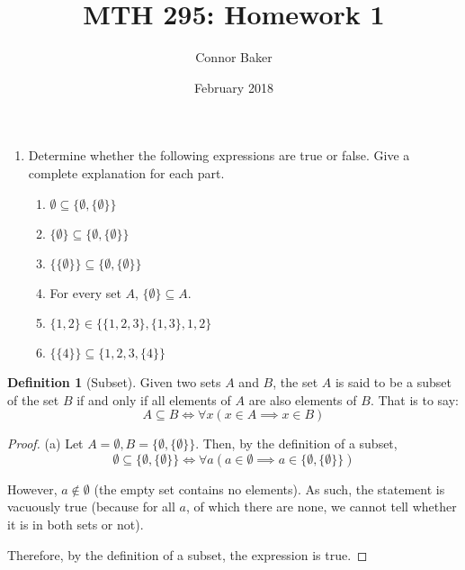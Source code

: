 \documentclass[10pt]{article}
\title{MTH 295: Homework 1}
\author{Connor Baker}
\date{February 2018}
\theoremstyle{definition}
\theoremstyle{definition}
\newtheorem*{definition}{Definition}
\theoremstyle{plain}
\begin{document}
\maketitle

\begin{enumerate}
\item Determine whether the following expressions are true or false. Give a complete explanation for each part.
\begin{enumerate}
\item $\emptyset \subseteq \{\emptyset, \{ \emptyset \} \}$
\item $\{\emptyset\} \subseteq \{\emptyset, \{ \emptyset \} \}$
\item $\{\{\emptyset\}\} \subseteq \{\emptyset, \{ \emptyset \} \}$
\item For every set $A$, $\{\emptyset\} \subseteq A.$
\item $\{1,2\} \in \{\{1,2,3\},\{1,3\}, 1, 2\}$
\item $\{\{4\}\} \subseteq \{1,2,3,\{4\}\}$
\end{enumerate}
\end{enumerate}

\begin{definition}[Subset]
Given two sets $A$ and $B$, the set $A$ is said to be a subset of the set $B$ if and only if all elements of $A$ are also elements of $B$. That is to say:
\begin{equation*}
A \subseteq B \iff \forall x(x\in A \implies x\in B)
\end{equation*}
\end{definition}

\begin{proof}{(a)}
Let $A=\emptyset, B = \{\emptyset,\{\emptyset\}\}$. Then, by the definition of a subset,
\begin{equation*}
\emptyset \subseteq \{\emptyset,\{\emptyset\}\} \iff \forall a(a\in \emptyset \implies a\in \{\emptyset,\{\emptyset\}\})
\end{equation*}

\noindent However, $a\not\in\emptyset$ (the empty set contains no elements). As such, the statement is vacuously true (because for all $a$, of which there are none, we cannot tell whether it is in both sets or not).

\noindent Therefore, by the definition of a subset, the expression is true.
\end{proof}
\end{document}
